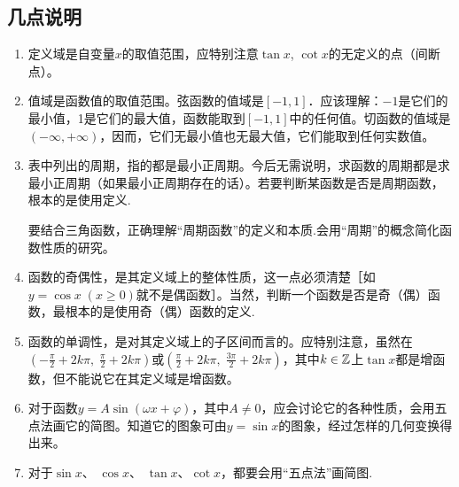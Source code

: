 \begin{figure}[htp]








    \caption{}
\end{figure}



\subsection{几点说明}
\begin{enumerate}
    \item 定义域是自变量$x$的取值范围，应特别注意$\tan x$, $\cot x$的无定义的点（间断点）。
    \item 值域是函数值的取值范围。弦函数的值域是$[-1,1]$．应该理解：$-1$是它们的最小值，1是它们的最大值，函数能取到$[-1,1]$中的任何值。切函数的值域是$(-\infty,+\infty)$，因而，它们无最小值也无最大值，它们能取到任何实数值。
    \item 表中列出的周期，指的都是最小正周期。今后无需说明，求函数的周期都是求最小正周期（如果最小正周期存在的话）。若要判断某函数是否是周期函数，根本的是使用定义.
    
    要结合三角函数，正确理解“周期函数”的定义和本质.会用“周期”的概念简化函数性质的研究。
    \item 函数的奇偶性，是其定义域上的整体性质，这一点必须清楚［如$y=\cos x\; (x\ge 0)$就不是偶函数］。当然，判断一个函数是否是奇（偶）函数，最根本的是使用奇（偶）函数的定义.
    \item 函数的单调性，是对其定义域上的子区间而言的。应特别注意，虽然在$\left(-\frac{\pi}{2}+2k\pi,\; \frac{\pi}{2}+2k\pi\right)$或$\left(\frac{\pi}{2}+2k\pi,\; \frac{3\pi}{2}+2k\pi\right)$，其中$k\in\mathbb{Z}$上$\tan x$都是增函数，但不能说它在其定义域是增函数。
    \item  对于函数$y=A\sin(\omega x+\varphi)$，其中$A\ne 0$，应会讨论它的各种性质，会用五点法画它的简图。知道它的图象可由$y=\sin x$的图象，经过怎样的几何变换得出来。
    \item 对于$\sin x$、 $\cos x$、 $\tan x$、$\cot x$，都要会用“五点法”画简图.
\end{enumerate}




